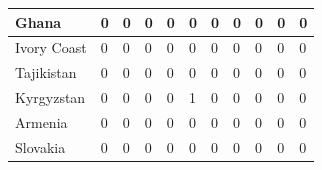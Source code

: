 \documentclass[12pt]{article}  %
\begin{document}
\begin{subappendices}
\begin{longtable}{|l|l|l|l|l|l|l|l|l|l|l|}
	\hline
	Ghana                                                          & 0                                                 & 0                                                 & 0                                                 & 0                                                 & 0                                                 & 0                                                 & 0    & 0      & 0      & 0      \\ 
	\hline
	Ivory Coast                                                    & 0                                                 & 0                                                 & 0                                                 & 0                                                 & 0                                                 & 0                                                 & 0    & 0      & 0      & 0      \\ 
	\hline
	Tajikistan                                                     & 0                                                 & 0                                                 & 0                                                 & 0                                                 & 0                                                 & 0                                                 & 0    & 0      & 0      & 0      \\ 
	\hline
	Kyrgyzstan                                                     & 0                                                 & 0                                                 & 0                                                 & 0                                                 & 1                                                 & 0                                                 & 0    & 0      & 0      & 0      \\ 
	\hline
	Armenia                                                        & 0                                                 & 0                                                 & 0                                                 & 0                                                 & 0                                                 & 0                                                 & 0    & 0      & 0      & 0      \\ 
	\hline
	Slovakia                                                       & 0                                                 & 0                                                 & 0                                                 & 0                                                 & 0                                                 & 0                                                 & 0    & 0      & 0      & 0      \\ 

\end{longtable}
\end{subappendices}
\end{document}

